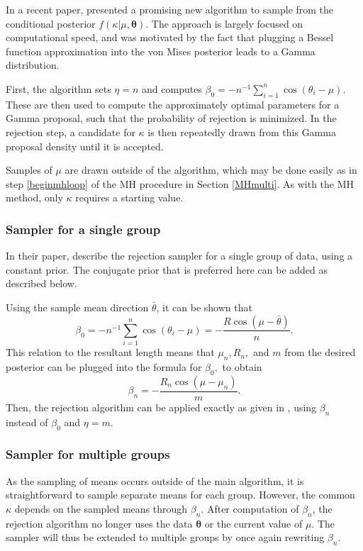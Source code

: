 \documentclass[bib]{ba/ba}
\begin{document}
In a recent paper, \citet{forbes2014fast} presented a promising new algorithm to sample from the conditional posterior $f(\kappa \vert \mu, \boldsymbol\theta)$. The approach is largely focused on computational speed, and was motivated by the fact that plugging a Bessel function approximation into the von Mises posterior leads to a Gamma distribution.

First, the algorithm sets $\eta = n$ and computes $\beta_0 = - n^{-1} \sum_{i=1}^{n} \cos(\theta_i - \mu)$. These are then used to compute the approximately optimal parameters for a Gamma proposal, such that the probability of rejection is minimized. In the rejection step, a candidate for $\kappa$ is then repeatedly drawn from this Gamma proposal density until it is accepted. 

Samples of $\mu$ are drawn outside of the algorithm, which may be done easily as in step \ref{beginmhloop} of the MH procedure in Section \ref{MHmulti}. As with the MH method, only $\kappa$ requires a starting value. 

\subsubsection{Sampler for a single group}

In their paper, \citet{forbes2014fast} describe the rejection sampler for a single group of data, using a constant prior. The conjugate prior that is preferred here can be added as described below. 

Using the sample mean direction $\bar{\theta}$, it can be shown that
$$ \beta_0 = - n^{-1} \sum_{i=1}^{n} \cos(\theta_i - \mu) = - \frac{R\cos (\mu - \bar\theta) }{n}.$$
This relation to the resultant length means that $\mu_n, R_n,$ and $m$ from the desired posterior can be plugged into the formula for $\beta_0,$ to obtain
$$\beta_n = - \frac{R_{n} \cos (\mu - \mu_{n})}{m}.$$
Then, the rejection algorithm can be applied exactly as given in \citet{forbes2014fast}, using $\beta_n$ instead of $\beta_0$ and $\eta = m$.

\subsubsection{Sampler for multiple groups}

As the sampling of means occurs outside of the main algorithm, it is straightforward to sample separate means for each group. However, the common $\kappa$ depends on the sampled means through $\beta_n$. After computation of $\beta_n$, the rejection algorithm no longer uses the data $\boldsymbol\theta$ or the current value of $\mu$. The sampler will thus be extended to multiple groups by once again rewriting $\beta_n$. 
\end{document}
